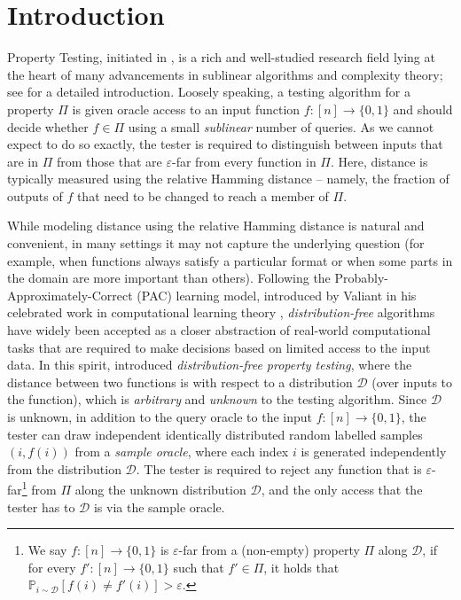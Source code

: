 \documentclass[11pt]{article}
\newcommand{\sD}{\mathcal{D}}
\begin{document}
\newpage
\setcounter{tocdepth}{2}
\tableofcontents
\thispagestyle{empty}

\newpage
\setcounter{page}{1}

\section{Introduction}
Property Testing, initiated in \cite{RS96, GGR98}, is a rich and well-studied research field lying at the heart of many advancements in sublinear algorithms and complexity theory; see \cite{Gol17_book,BY22} for a detailed introduction. Loosely speaking, a testing algorithm for a property $\Pi$ is given oracle access to an input function $f:[n]\rightarrow\{0,1\}$ and should decide whether $f \in \Pi$ using a small \emph{sublinear} number of queries. As  we cannot expect to do so exactly, the tester is required to distinguish between inputs that are in $\Pi$ from those that are $\varepsilon$-far from every function in $\Pi$. Here, distance is typically measured using the relative Hamming distance -- namely, the fraction of outputs of $f$ that need to be changed to reach a member of $\Pi$.

While modeling distance using the relative Hamming distance is natural and convenient, in many settings it may not capture the underlying question (for example, when functions always satisfy a particular format or when some parts in the domain are more important than others). Following the Probably-Approximately-Correct (PAC) learning model, introduced by Valiant in his celebrated work in computational learning theory \cite{Valiant1984}, \textit{distribution-free} algorithms have widely been accepted as a closer abstraction of real-world computational tasks that are required to make decisions based on limited access to the input data. In this spirit, \cite{GGR98} introduced \textit{distribution-free property testing}, where the distance between two functions is with respect to a distribution $\sD$ (over inputs to the function), which is \textit{arbitrary} and \textit{unknown} to the testing algorithm. Since $\sD$ is unknown, in addition to the query oracle to the input $f:[n]\rightarrow \{0,1\}$, the tester can draw independent identically distributed random labelled samples $(i,f(i))$ from a \textit{sample oracle}, where each index $i$ is generated independently from the distribution $\sD$. The tester is required to reject any function that is $\varepsilon$-far\footnote{We say $f:[n]\rightarrow\{0,1\}$ is $\varepsilon$-far from a (non-empty) property $\Pi$ along $\sD$, if for every $f':[n] \rightarrow \{0,1\}$ such that $f' \in \Pi$, it holds that $\mathbb{P}_{i \sim \sD} [f(i) \neq f'(i)]> \varepsilon$.} from $\Pi$ along the unknown distribution $\sD$, and the only access that the tester has to $\sD$ is via the sample oracle. 
\end{document}
